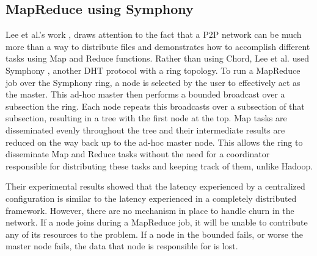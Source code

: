 \documentclass[10pt, conference, compsocconf]{IEEEtran}
\begin{document}

\subsection{MapReduce using Symphony}

Lee et al.'s work \cite{leemap}, draws attention to the fact that a P2P network can be much more than a way to distribute files and demonstrates how to accomplish different tasks using Map and Reduce functions.  Rather than using Chord, Lee et al. used Symphony \cite{symphony}, another DHT protocol with a ring topology.  To run a MapReduce job over the Symphony ring, a node is selected by the user to effectively act as the master.  This ad-hoc master then performs a bounded broadcast over a subsection the ring.  Each node repeats this broadcasts over a subsection of that subsection, resulting in a tree with the first node at the top.  Map tasks are disseminated evenly throughout the tree and their intermediate results are reduced on the way back up to the ad-hoc master node.  This allows the ring to disseminate Map and Reduce tasks without the need for a coordinator responsible for distributing these tasks and keeping track of them, unlike Hadoop.
 
Their experimental results showed that the latency experienced by a centralized configuration is similar to the latency experienced in a completely distributed framework.  However, there are no mechanism in place to handle churn in the network.  If a node joins during a MapReduce job, it will be unable to contribute any of its resources to the problem. If a node in the bounded fails, or worse the master node fails, the data that node is responsible for is lost. 
 
\end{document}
